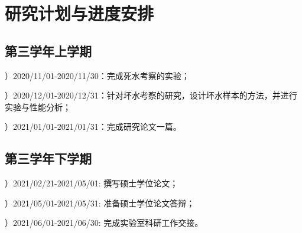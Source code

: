 \chapter{研究计划与进度安排}

\section{第三学年上学期}

）2020/11/01-2020/11/30：完成死水考察的实验；

）2020/12/01-2020/12/31：针对坏水考察的研究，设计坏水样本的方法，并进行实验与性能分析；

）2021/01/01-2021/01/31：完成研究论文一篇。

\section{第三学年下学期}

）2021/02/21-2021/05/01: 撰写硕士学位论文；

）2021/05/01-2021/05/31: 准备硕士学位论文答辩；

）2021/06/01-2021/06/30: 完成实验室科研工作交接。